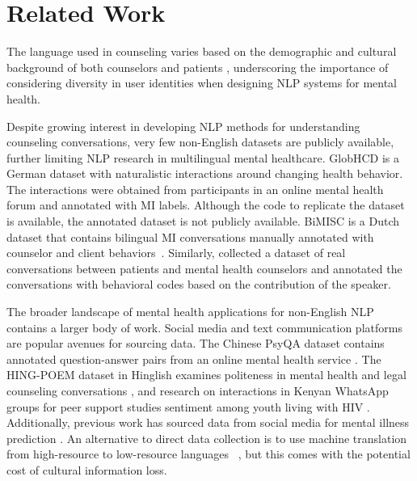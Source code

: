 \section{Related Work}
The language used in counseling varies based on the demographic and cultural background of both counselors and patients \cite{loveys-etal-2018-cross, guda-etal-2021-empathbert}, underscoring the importance of considering diversity in user identities when designing NLP systems for mental health. 


Despite growing interest in developing NLP methods for understanding counseling conversations, very few non-English datasets are publicly available, further limiting NLP research in multilingual mental healthcare. GlobHCD
\cite{meyer-elsweiler-2022-glohbcd}
is a German dataset with naturalistic interactions around changing health behavior. The interactions were obtained from participants in an online mental health forum and annotated with MI labels. Although the code to replicate the dataset is available, the annotated dataset is not publicly available.
BiMISC is a Dutch dataset that contains bilingual MI conversations manually annotated with counselor and client behaviors~\cite{dutch-mi}. Similarly,  \citet{hebrew-counseling} collected a dataset of real conversations between patients and mental health counselors and annotated the conversations with behavioral codes based on the contribution of the speaker.%

The broader landscape of mental health applications for non-English NLP contains a larger body of work. Social media and text communication platforms are popular avenues for sourcing data.
The Chinese PsyQA dataset contains annotated question-answer pairs from an online mental health service \cite{chinese-mi}. The HING-POEM dataset in Hinglish examines politeness in mental health and legal counseling conversations \cite{hinglish-mi}, and research on interactions in Kenyan WhatsApp groups for peer support studies sentiment among youth living with HIV \cite{sheng-mi}. Additionally, previous work  has sourced data from social media for mental illness prediction \cite{prieto2014twitter, lopez-ubeda-etal-2019-detecting}. 
An alternative to direct data collection  is to use machine translation from high-resource to low-resource languages ~\cite{arabic-medical-llm, polish-mh-dialogues}, but this comes with the potential cost of cultural information loss.

